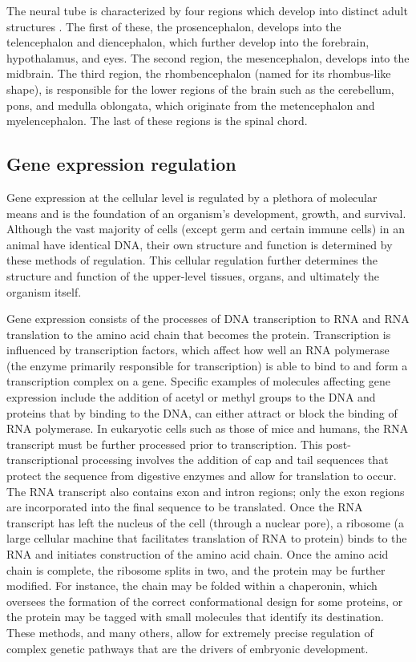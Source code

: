 \documentclass[12pt,oneside,onecolumn,a4paper]{article}
\begin{document}
The neural tube is characterized by four regions which develop into distinct adult structures \citep{Bakken_2015}. The first of these, the prosencephalon, develops into the telencephalon and diencephalon, which further develop into the forebrain, hypothalamus, and eyes. The second region, the mesencephalon, develops into the midbrain. The third region, the rhombencephalon (named for its rhombus-like shape), is responsible for the lower regions of the brain such as the cerebellum, pons, and medulla oblongata, which originate from the metencephalon and myelencephalon. The last of these regions is the spinal chord.

\subsection{Gene expression regulation}\label{regulation}
Gene expression at the cellular level is regulated by a plethora of molecular means and is the foundation of an organism's development, growth, and survival. Although the vast majority of cells (except germ and certain immune cells) in an animal have identical DNA, their own structure and function is determined by these methods of regulation. This cellular regulation further determines the structure and function of the upper-level tissues, organs, and ultimately the organism itself. 

Gene expression consists of the processes of DNA transcription to RNA and RNA translation to the amino acid chain that becomes the protein. Transcription is influenced by transcription factors, which affect how well an RNA polymerase (the enzyme primarily responsible for transcription) is able to bind to and form a transcription complex on a gene. Specific examples of molecules affecting gene expression include the addition of acetyl or methyl groups to the DNA and proteins that by binding to the DNA, can either attract or block the binding of RNA polymerase. In eukaryotic cells such as those of mice and humans, the RNA transcript must be further processed prior to transcription. This post-transcriptional processing involves the addition of cap and tail sequences that protect the sequence from digestive enzymes and allow for translation to occur. The RNA transcript also contains exon and intron regions; only the exon regions are incorporated into the final sequence to be translated. Once the RNA transcript has left the nucleus of the cell (through a nuclear pore), a ribosome (a large cellular machine that facilitates translation of RNA to protein) binds to the RNA and initiates construction of the amino acid chain. Once the amino acid chain is complete, the ribosome splits in two, and the protein may be further modified. For instance, the chain may be folded within a chaperonin, which oversees the formation of the correct conformational design for some proteins, or the protein may be tagged with small molecules that identify its destination. These methods, and many others, allow for extremely precise regulation of complex genetic pathways that are the drivers of embryonic development.
\end{document}
